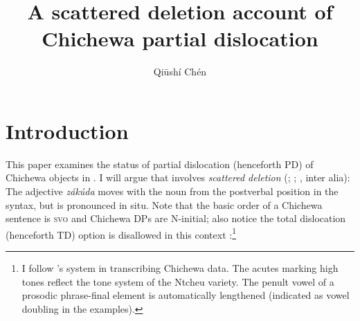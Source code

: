 \documentclass[output=paper,colorlinks,citecolor=brown
]{langscibook}
\author{Qi\={u}sh\'{i} Ch\'{e}n \affiliation{University of Connecticut}}
\title{A scattered deletion account of Chichewa partial dislocation}
\begin{document}
\maketitle
\section{Introduction}\label{sec:chen:1}
This paper examines the status of partial dislocation (henceforth PD) of Chichewa objects in . I will argue that  involves \textit{scattered deletion} (\citealp{bovskovic2001interface}; \citealp{fanselow2002distributed}; \citealp{boskovic2007copy}, inter alia): The adjective \textit{z\'{a}k\'{u}da} moves with the noun from the postverbal position in the syntax, but is pronounced in situ. Note that the basic order of a Chichewa sentence is \textsc{svo}  and Chichewa DPs are N-initial; also notice the total dislocation (henceforth TD) option is disallowed in this context :\footnote{I follow \citeauthor{downing2017phonology}'s \citeyear{downing2017phonology} system in transcribing Chichewa data. The acutes marking high tones reflect the tone system of the Ntcheu variety. The penult vowel of a prosodic phrase-final element is automatically lengthened (indicated as vowel doubling in the examples).}
\end{document}
